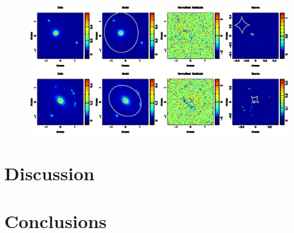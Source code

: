 \documentclass[a4paper,fleqn,usenatbib]{mnras}
\begin{document}
   \begin{figure}
\begin{center} 
\includegraphics[width = 16 cm]{fig6a.ps}
\includegraphics[width = 16 cm]{fig6b.ps}
\contcaption{}
\end{center}     
 \end{figure}


\section{Discussion}
\label{sec:disc}

\section{Conclusions}
\label{sec:conc}

%
\end{document}
